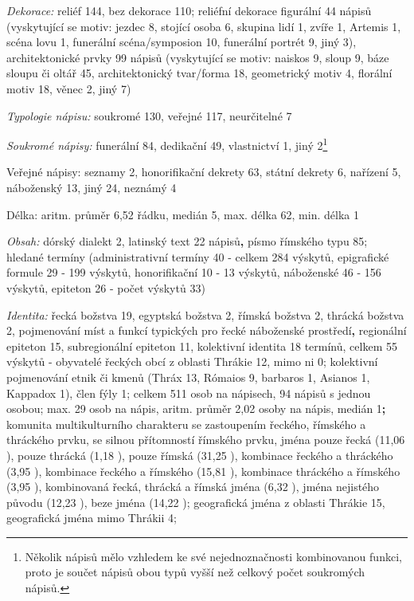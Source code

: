 {\em Dekorace:} reliéf 144, bez dekorace 110; reliéfní dekorace figurální 44 nápisů (vyskytující se motiv: jezdec 8, stojící osoba 6, skupina lidí 1, zvíře 1, Artemis 1, scéna lovu 1, funerální scéna/symposion 10, funerální portrét 9, jiný 3), architektonické prvky 99 nápisů (vyskytující se motiv: naiskos 9, sloup 9, báze sloupu či oltář 45, architektonický tvar/forma 18, geometrický motiv 4, florální motiv 18, věnec 2, jiný 7)

{\em Typologie nápisu:} soukromé 130, veřejné 117, neurčitelné 7

{\em Soukromé nápisy:} funerální 84, dedikační 49, vlastnictví 1, jiný 2\footnote{Několik nápisů mělo vzhledem ke své nejednoznačnosti kombinovanou funkci, proto je součet nápisů obou typů vyšší než celkový počet soukromých nápisů.}

Veřejné nápisy: seznamy 2, honorifikační dekrety 63, státní dekrety 6, nařízení 5, náboženský 13, jiný 24, neznámý 4

Délka: aritm. průměr 6,52 řádku, medián 5, max. délka 62, min. délka 1

{\em Obsah:} dórský dialekt 2, latinský text 22 nápisů{\bf ,} písmo římského typu 85; hledané termíny (administrativní termíny 40 - celkem 284 výskytů, epigrafické formule 29 - 199 výskytů, honorifikační 10 - 13 výskytů, náboženské 46 - 156 výskytů, epiteton 26 - počet výskytů 33)

{\em Identita:} řecká božstva 19, egyptská božstva 2, římská božstva 2, thrácká božstva 2, pojmenování míst a funkcí typických pro řecké náboženské prostředí{\bf ,} regionální epiteton 15, subregionální epiteton 11, kolektivní identita 18 termínů, celkem 55 výskytů - obyvatelé řeckých obcí z oblasti Thrákie 12, mimo ni 0; kolektivní pojmenování etnik či kmenů (Thráx 13, Rómaios 9, barbaros 1, Asianos 1, Kappadox 1), člen fýly 1; celkem 511 osob na nápisech, 94 nápisů s jednou osobou; max. 29 osob na nápis, aritm. průměr 2,02 osoby na nápis, medián 1{\bf ;} komunita multikulturního charakteru se zastoupením řeckého, římského a thráckého prvku, se silnou přítomností římského prvku, jména pouze řecká (11,06 ), pouze thrácká (1,18 ), pouze římská (31,25 ), kombinace řeckého a thráckého (3,95 ), kombinace řeckého a římského (15,81 ), kombinace thráckého a římského (3,95 ), kombinovaná řecká, thrácká a římská jména (6,32 ), jména nejistého původu (12,23 ), beze jména (14,22 ); geografická jména z oblasti Thrákie 15, geografická jména mimo Thrákii 4;

